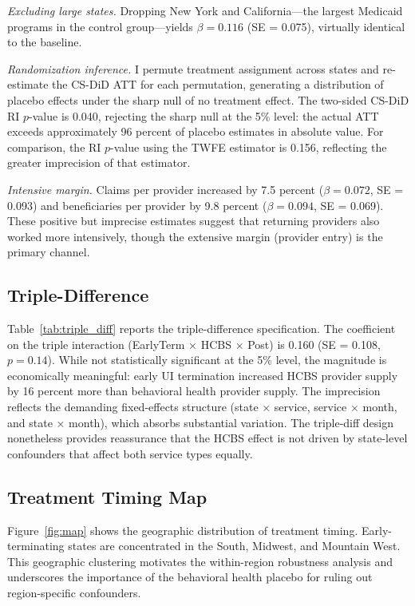 \documentclass[12pt]{article}
\begin{document}
\textit{Excluding large states.} Dropping New York and California---the largest Medicaid programs in the control group---yields $\beta = 0.116$ (SE = 0.075), virtually identical to the baseline.

\textit{Randomization inference.} I permute treatment assignment across states and re-estimate the CS-DiD ATT for each permutation, generating a distribution of placebo effects under the sharp null of no treatment effect. The two-sided CS-DiD RI $p$-value is 0.040, rejecting the sharp null at the 5\% level: the actual ATT exceeds approximately 96 percent of placebo estimates in absolute value. For comparison, the RI $p$-value using the TWFE estimator is 0.156, reflecting the greater imprecision of that estimator.

\textit{Intensive margin.} Claims per provider increased by 7.5 percent ($\beta = 0.072$, SE = 0.093) and beneficiaries per provider by 9.8 percent ($\beta = 0.094$, SE = 0.069). These positive but imprecise estimates suggest that returning providers also worked more intensively, though the extensive margin (provider entry) is the primary channel.



\subsection{Triple-Difference}

Table~\ref{tab:triple_diff} reports the triple-difference specification. The coefficient on the triple interaction (EarlyTerm $\times$ HCBS $\times$ Post) is 0.160 (SE = 0.108, $p = 0.14$). While not statistically significant at the 5\% level, the magnitude is economically meaningful: early UI termination increased HCBS provider supply by 16 percent more than behavioral health provider supply. The imprecision reflects the demanding fixed-effects structure (state $\times$ service, service $\times$ month, and state $\times$ month), which absorbs substantial variation. The triple-diff design nonetheless provides reassurance that the HCBS effect is not driven by state-level confounders that affect both service types equally.



\subsection{Treatment Timing Map}

Figure~\ref{fig:map} shows the geographic distribution of treatment timing. Early-terminating states are concentrated in the South, Midwest, and Mountain West. This geographic clustering motivates the within-region robustness analysis and underscores the importance of the behavioral health placebo for ruling out region-specific confounders.
\end{document}
